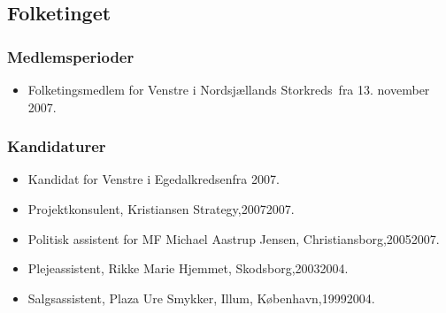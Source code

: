 \documentclass[11pt, a4paper]{awesome-cv}
\begin{document}
\begin{cvletter}
\subsection*{Folketinget}
\subsubsection*{Medlemsperioder}
\begin{itemize}
\item Folketingsmedlem for Venstre i Nordsjællands Storkreds fra 13. november 2007.
\end{itemize}
\subsubsection*{Kandidaturer}
\begin{itemize}
\item Kandidat for Venstre i Egedalkredsenfra 2007.
\end{itemize}
\begin{itemize}
\item Projektkonsulent, Kristiansen Strategy,20072007.
\item Politisk assistent for MF Michael Aastrup Jensen, Christiansborg,20052007.
\item Plejeassistent, Rikke Marie Hjemmet, Skodsborg,20032004.
\item Salgsassistent, Plaza Ure  Smykker, Illum, København,19992004.
\end{itemize}
\end{cvletter}
\end{document}
